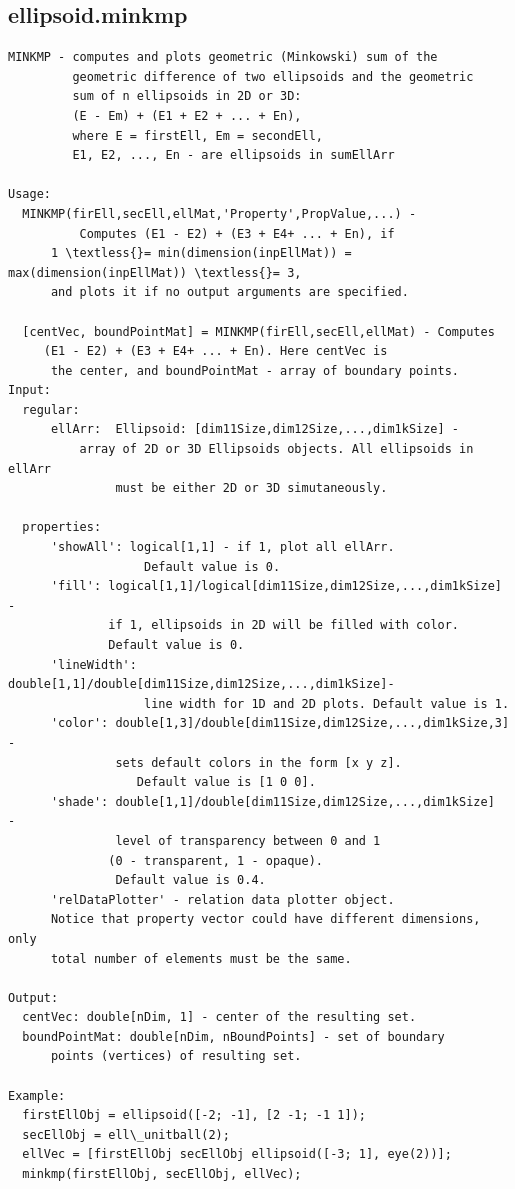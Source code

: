 \documentclass[letterpaper,10pt,english]{sphinxmanual}
\begin{document}
\subsection{ellipsoid.minkmp}
\label{chap_functions:ellipsoid-minkmp}
\begin{Verbatim}[commandchars=\\\{\}]
MINKMP - computes and plots geometric (Minkowski) sum of the
         geometric difference of two ellipsoids and the geometric
         sum of n ellipsoids in 2D or 3D:
         (E - Em) + (E1 + E2 + ... + En),
         where E = firstEll, Em = secondEll,
         E1, E2, ..., En - are ellipsoids in sumEllArr

Usage:
  MINKMP(firEll,secEll,ellMat,'Property',PropValue,...) -
          Computes (E1 - E2) + (E3 + E4+ ... + En), if
      1 \textless{}= min(dimension(inpEllMat)) = max(dimension(inpEllMat)) \textless{}= 3,
      and plots it if no output arguments are specified.

  [centVec, boundPointMat] = MINKMP(firEll,secEll,ellMat) - Computes
     (E1 - E2) + (E3 + E4+ ... + En). Here centVec is
      the center, and boundPointMat - array of boundary points.
Input:
  regular:
      ellArr:  Ellipsoid: [dim11Size,dim12Size,...,dim1kSize] -
          array of 2D or 3D Ellipsoids objects. All ellipsoids in ellArr
               must be either 2D or 3D simutaneously.

  properties:
      'showAll': logical[1,1] - if 1, plot all ellArr.
                   Default value is 0.
      'fill': logical[1,1]/logical[dim11Size,dim12Size,...,dim1kSize]  -
              if 1, ellipsoids in 2D will be filled with color.
              Default value is 0.
      'lineWidth': double[1,1]/double[dim11Size,dim12Size,...,dim1kSize]-
                   line width for 1D and 2D plots. Default value is 1.
      'color': double[1,3]/double[dim11Size,dim12Size,...,dim1kSize,3] -
               sets default colors in the form [x y z].
                  Default value is [1 0 0].
      'shade': double[1,1]/double[dim11Size,dim12Size,...,dim1kSize]  -
               level of transparency between 0 and 1
              (0 - transparent, 1 - opaque).
               Default value is 0.4.
      'relDataPlotter' - relation data plotter object.
      Notice that property vector could have different dimensions, only
      total number of elements must be the same.

Output:
  centVec: double[nDim, 1] - center of the resulting set.
  boundPointMat: double[nDim, nBoundPoints] - set of boundary
      points (vertices) of resulting set.

Example:
  firstEllObj = ellipsoid([-2; -1], [2 -1; -1 1]);
  secEllObj = ell\_unitball(2);
  ellVec = [firstEllObj secEllObj ellipsoid([-3; 1], eye(2))];
  minkmp(firstEllObj, secEllObj, ellVec);
\end{Verbatim}
\end{document}
